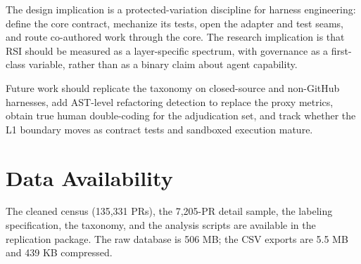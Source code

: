 \documentclass[sigconf,review]{acmart}
\begin{document}
The design implication is a protected-variation discipline for harness engineering: define the core contract, mechanize its tests, open the adapter and test seams, and route co-authored work through the core. The research implication is that RSI should be measured as a layer-specific spectrum, with governance as a first-class variable, rather than as a binary claim about agent capability.

Future work should replicate the taxonomy on closed-source and non-GitHub harnesses, add AST-level refactoring detection to replace the proxy metrics, obtain true human double-coding for the adjudication set, and track whether the L1 boundary moves as contract tests and sandboxed execution mature.

\section*{Data Availability}

The cleaned census (135,331 PRs), the 7,205-PR detail sample, the labeling specification, the taxonomy, and the analysis scripts are available in the replication package. The raw database is 506 MB; the CSV exports are 5.5 MB and 439 KB compressed.
\end{document}
